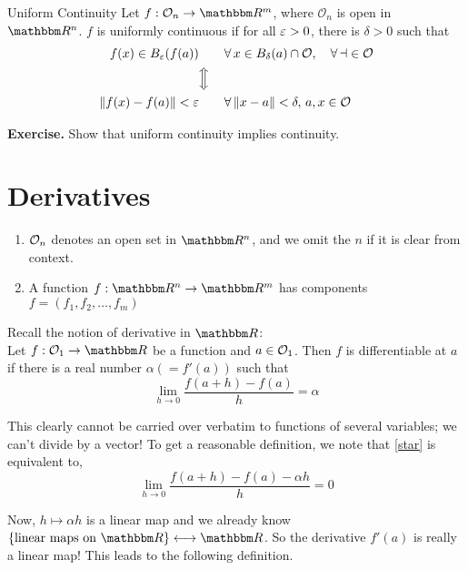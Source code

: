 \documentclass[Analysis-3]{subfiles}
\begin{document}
\begin{Def}{Uniform Continuity}{}
  Let $ f : \mathcal{O}_n \to \R^m $, where $ \mathcal{O}_n $ is open in $ \R^n $. $ f $ is uniformly continuous if for all $ \varepsilon > 0 $, there is $ \delta > 0 $ such that
  \begin{alignat*}{2}
    f(x) \in B_\varepsilon(f(a))     & \quad            &  & \forall \, x \in B_\delta(a) \cap \cal O, \quad \forall \, a \in \cal O \\
                               & \Big\Updownarrow                                                                              \\
    \norm{f(x) - f(a)} < \varepsilon & \quad            &  & \forall \, \norm{x - a} < \delta, \, a,x \in \cal O
  \end{alignat*}
\end{Def}

\textbf{Exercise.} Show that uniform continuity implies continuity.

\section{Derivatives}

\begin{notnBox}{}{}
  \begin{enumerate}[label = (\arabic*)]
    \item $ {\cal O}_n $ denotes an open set in $ \R^n $, and we omit the $ n $ if it is clear from context.
    \item A function $ f:\R^n \to \R^m $ has components $ f = (f_1, f_2, \dots, f_m) $
  \end{enumerate}
\end{notnBox}
\ssk

Recall the notion of derivative in $ \R $: \\
Let $ f : {\cal O}_1 \to \R $ be a function and $ a \in {\cal O}_1 $. Then $ f $ is differentiable at $ a $ if there is a real number $ \alpha (= f'(a)) $ such that
\[ \lim_{h \to 0}\frac{f(a+h)-f(a)}{h} = \alpha \label{star}\tag{1} \]

This clearly cannot be carried over verbatim to functions of several variables; we can't divide by a vector! To get a reasonable definition, we note that \eqref{star} is equivalent to,
\[ \lim_{h \to 0}\frac{f(a+h)-f(a)-\alpha h}{h} = 0 \]

Now, $ h \mapsto \alpha h $ is a linear map and we already know $ \{\text{linear maps on } \R\} \longleftrightarrow \R $. So the derivative $ f'(a) $ is really a linear map! This leads to the following definition.
\end{document}
